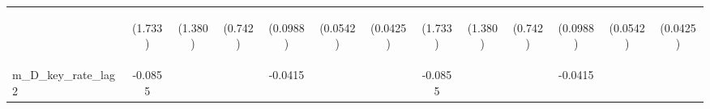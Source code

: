 \documentclass[]{article}
\begin{document}
\begin{center}
\begin{tabular}{lcccccccccccc}
\vspace{4pt} & \begin{footnotesize}(1.733)\end{footnotesize} & \begin{footnotesize}(1.380)\end{footnotesize} & \begin{footnotesize}(0.742)\end{footnotesize} & \begin{footnotesize}(0.0988)\end{footnotesize} & \begin{footnotesize}(0.0542)\end{footnotesize} & \begin{footnotesize}(0.0425)\end{footnotesize} & \begin{footnotesize}(1.733)\end{footnotesize} & \begin{footnotesize}(1.380)\end{footnotesize} & \begin{footnotesize}(0.742)\end{footnotesize} & \begin{footnotesize}(0.0988)\end{footnotesize} & \begin{footnotesize}(0.0542)\end{footnotesize} & \begin{footnotesize}(0.0425)\end{footnotesize} \\
m\_D\_key\_rate\_lag2 & -0.0855 &  &  & -0.0415 &  &  & -0.0855 &  &  & -0.0415 &  &  \\

\end{tabular}
\end{center}
\end{document}
